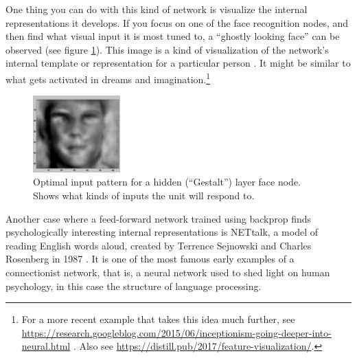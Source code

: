 One thing you can do with this kind of network is visualize the internal representations it develops. If you focus on one of the face recognition nodes, and then find what visual input it is most tuned to, a ``ghostly looking face'' can be observed (see figure \ref{holon}). This image is a kind of visualization of the network's internal template or representation for a particular person \cite{dailey2002empath}. It might be similar to what gets activated in dreams and imagination.\footnote{For a more recent example that takes this idea much further, see \url{https://research.googleblog.com/2015/06/inceptionism-going-deeper-into-neural.html} \cite{mordvintsev2015inceptionism}. Also see \url{https://distill.pub/2017/feature-visualization/}.}

\begin{figure}[h]
\centering
\includegraphics[width=0.3\textwidth]{images/holon.png}
\caption[From \url{http://cseweb.ucsd.edu/\~gary/258a/Backprop.pdf}.]{Optimal input pattern for a hidden (``Gestalt'') layer face node. Shows what kinds of inputs the unit will respond to.}
\label{holon}
\end{figure}

Another case where a feed-forward network trained using backprop finds psychologically interesting internal representations is NETtalk, a model of reading English words aloud, created by Terrence Sejnowski and Charles Rosenberg in 1987 \cite{sejnowski1987parallel}. It is one of the most famous early examples of a connectionist network, that is, a neural network used to shed light on human psychology, in this case the structure of language processing.

